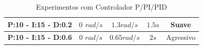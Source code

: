 \begin{table}[!htb]
\begin{tabular}{|c|c|c|c|c|}
		\textbf{P:10 - I:15 - D:0.2}                                                              & $0$ $rad/s$                                                               & $1.3 rad/s$                                                            & $1.5s$                                                                    & Suave             \\ \hline
		\textbf{P:10 - I:15 - D:0.6}                                                              & $0$ $rad/s$                                                               & $0.65 rad/s$                                                           & $2s$                                                                      & Agressivo         \\ \hline
	\end{tabular}
	\caption{Experimentos com Controlador P/PI/PID}
	\label{t:cpid}
\end{table}


